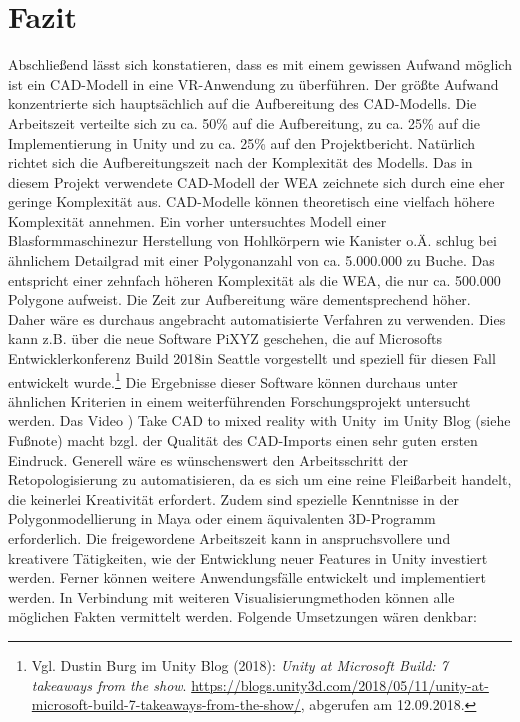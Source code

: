 \chapter{Fazit}
\label{sec:Fazit}

Abschließend lässt sich konstatieren, dass es mit einem gewissen Aufwand möglich ist ein CAD-Modell in eine VR-Anwendung zu überführen. Der größte Aufwand konzentrierte sich hauptsächlich auf die Aufbereitung des CAD-Modells. Die Arbeitszeit verteilte sich zu ca. 50\% auf die Aufbereitung, zu ca. 25\% auf die Implementierung in Unity und zu ca. 25\% auf den Projektbericht. Natürlich richtet sich die Aufbereitungszeit nach der Komplexität des Modells. Das in diesem Projekt verwendete CAD-Modell der WEA zeichnete sich durch eine eher geringe Komplexität aus. CAD-Modelle können theoretisch eine vielfach höhere Komplexität annehmen. 
Ein vorher untersuchtes Modell einer \glqq Blasformmaschine\grqq zur Herstellung von Hohlkörpern wie Kanister o.Ä. schlug bei ähnlichem Detailgrad mit einer Polygonanzahl von ca. 5.000.000 zu Buche. Das entspricht einer zehnfach höheren Komplexität als die WEA, die nur ca. 500.000 Polygone aufweist. Die Zeit zur Aufbereitung wäre dementsprechend höher. Daher wäre es durchaus angebracht automatisierte Verfahren zu verwenden. Dies kann z.B. über die neue Software PiXYZ geschehen, die auf Microsofts Entwicklerkonferenz \glqq Build 2018\grqq in Seattle vorgestellt und speziell für diesen Fall entwickelt wurde.\footnote{Vgl. Dustin Burg im Unity Blog (2018): \textit{Unity at Microsoft Build: 7 takeaways from the show}.\newline
\url{https://blogs.unity3d.com/2018/05/11/unity-at-microsoft-build-7-takeaways-from-the-show/},\newline 
abgerufen am 12.09.2018.} Die Ergebnisse dieser Software können durchaus unter ähnlichen Kriterien in einem weiterführenden Forschungsprojekt untersucht werden. Das Video ) Take CAD to mixed reality with Unity\grqq\, im Unity Blog (siehe Fußnote) macht bzgl. der Qualität des CAD-Imports  einen sehr guten ersten Eindruck. Generell wäre es wünschenswert den Arbeitsschritt der Retopologisierung zu automatisieren, da es sich um eine reine Fleißarbeit handelt, die keinerlei Kreativität erfordert. Zudem sind spezielle Kenntnisse in der Polygonmodellierung in Maya oder einem äquivalenten 3D-Programm erforderlich. Die freigewordene  Arbeitszeit kann in anspruchsvollere und kreativere Tätigkeiten, wie der Entwicklung neuer Features in Unity investiert werden.
Ferner können weitere Anwendungsfälle entwickelt und implementiert werden. In Verbindung mit weiteren Visualisierungmethoden können alle möglichen Fakten vermittelt werden. Folgende Umsetzungen wären denkbar:
